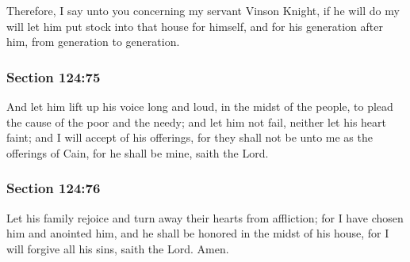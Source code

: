 		Therefore, I say unto you concerning my servant Vinson Knight, if he will do my will let him put stock into that house for himself, and for his generation after him, from generation to generation.


	\subsubsection{Section 124:75} %
		\label{DC124-75}

		And let him lift up his voice long and loud, in the midst of the people, to plead the cause of the poor and the needy; and let him not fail, neither let his heart faint; and I will accept of his offerings, for they shall not be unto me as the offerings of Cain, for he shall be mine, saith the Lord.


	\subsubsection{Section 124:76} %
		\label{DC124-76}

		Let his family rejoice and turn away their hearts from affliction; for I have chosen him and anointed him, and he shall be honored in the midst of his house, for I will forgive all his sins, saith the Lord.  Amen.


